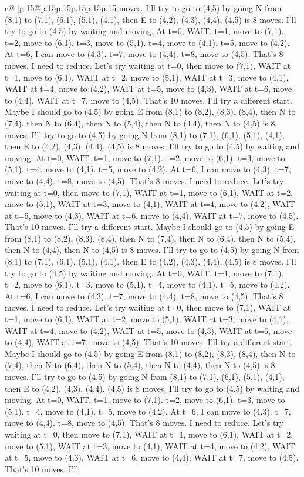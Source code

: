 \documentclass{article}
\begin{document}
{\begin{supertabular}{c@{$\;$}|p{.15\linewidth}@{}p{.15\linewidth}p{.15\linewidth}p{.15\linewidth}p{.15\linewidth}p{.15\linewidth}}
{{{moves. I'll try to go to (4,5) by going N from (8,1) to (7,1), (6,1), (5,1), (4,1), then E to (4,2), (4,3), (4,4), (4,5) is 8 moves. I'll try to go to (4,5) by waiting and moving. At t=0, WAIT. t=1, move to (7,1). t=2, move to (6,1). t=3, move to (5,1). t=4, move to (4,1). t=5, move to (4,2). At t=6, I can move to (4,3). t=7, move to (4,4). t=8, move to (4,5). That's 8 moves. I need to reduce. Let's try waiting at t=0, then move to (7,1), WAIT at t=1, move to (6,1), WAIT at t=2, move to (5,1), WAIT at t=3, move to (4,1), WAIT at t=4, move to (4,2), WAIT at t=5, move to (4,3), WAIT at t=6, move to (4,4), WAIT at t=7, move to (4,5). That's 10 moves. I'll try a different start. Maybe I should go to (4,5) by going E from (8,1) to (8,2), (8,3), (8,4), then N to (7,4), then N to (6,4), then N to (5,4), then N to (4,4), then N to (4,5) is 8 moves. I'll try to go to (4,5) by going N from (8,1) to (7,1), (6,1), (5,1), (4,1), then E to (4,2), (4,3), (4,4), (4,5) is 8 moves. I'll try to go to (4,5) by waiting and moving. At t=0, WAIT. t=1, move to (7,1). t=2, move to (6,1). t=3, move to (5,1). t=4, move to (4,1). t=5, move to (4,2). At t=6, I can move to (4,3). t=7, move to (4,4). t=8, move to (4,5). That's 8 moves. I need to reduce. Let's try waiting at t=0, then move to (7,1), WAIT at t=1, move to (6,1), WAIT at t=2, move to (5,1), WAIT at t=3, move to (4,1), WAIT at t=4, move to (4,2), WAIT at t=5, move to (4,3), WAIT at t=6, move to (4,4), WAIT at t=7, move to (4,5). That's 10 moves. I'll try a different start. Maybe I should go to (4,5) by going E from (8,1) to (8,2), (8,3), (8,4), then N to (7,4), then N to (6,4), then N to (5,4), then N to (4,4), then N to (4,5) is 8 moves. I'll try to go to (4,5) by going N from (8,1) to (7,1), (6,1), (5,1), (4,1), then E to (4,2), (4,3), (4,4), (4,5) is 8 moves. I'll try to go to (4,5) by waiting and moving. At t=0, WAIT. t=1, move to (7,1). t=2, move to (6,1). t=3, move to (5,1). t=4, move to (4,1). t=5, move to (4,2). At t=6, I can move to (4,3). t=7, move to (4,4). t=8, move to (4,5). That's 8 moves. I need to reduce. Let's try waiting at t=0, then move to (7,1), WAIT at t=1, move to (6,1), WAIT at t=2, move to (5,1), WAIT at t=3, move to (4,1), WAIT at t=4, move to (4,2), WAIT at t=5, move to (4,3), WAIT at t=6, move to (4,4), WAIT at t=7, move to (4,5). That's 10 moves. I'll try a different start. Maybe I should go to (4,5) by going E from (8,1) to (8,2), (8,3), (8,4), then N to (7,4), then N to (6,4), then N to (5,4), then N to (4,4), then N to (4,5) is 8 moves. I'll try to go to (4,5) by going N from (8,1) to (7,1), (6,1), (5,1), (4,1), then E to (4,2), (4,3), (4,4), (4,5) is 8 moves. I'll try to go to (4,5) by waiting and moving. At t=0, WAIT. t=1, move to (7,1). t=2, move to (6,1). t=3, move to (5,1). t=4, move to (4,1). t=5, move to (4,2). At t=6, I can move to (4,3). t=7, move to (4,4). t=8, move to (4,5). That's 8 moves. I need to reduce. Let's try waiting at t=0, then move to (7,1), WAIT at t=1, move to (6,1), WAIT at t=2, move to (5,1), WAIT at t=3, move to (4,1), WAIT at t=4, move to (4,2), WAIT at t=5, move to (4,3), WAIT at t=6, move to (4,4), WAIT at t=7, move to (4,5). That's 10 moves. I'll }}}
\end{supertabular}}
\end{document}
